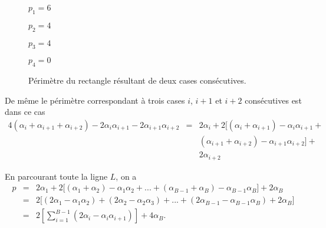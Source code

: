 \begin{Pre}
\begin{figure}[!htb]
\begin{minipage}[c]{.16\linewidth}
\begin{logicpuzzle}[rows=1,columns=2,color=cyan!100, width=750px,scale=0.5]
\framepuzzle[black!50]
\end{logicpuzzle}
$p_{1}=6$\quad\quad\quad
\end{minipage}
\hfill
\begin{minipage}[c]{.16\linewidth}
  \centering
\begin{logicpuzzle}[rows=1,columns=2,color=cyan!100, width=750px,scale=0.5]
\framepuzzle[black!50]
\end{logicpuzzle}
$p_{2}=4$\quad\quad\quad
\end{minipage}
\hfill
\begin{minipage}[c]{.16\linewidth}
  \centering
\begin{logicpuzzle}[rows=1,columns=2,color=cyan!100, width=750px,scale=0.5]
\framepuzzle[black!50]
\end{logicpuzzle}
$p_{3}=4$\quad\quad\quad
\end{minipage}
\hfill
\begin{minipage}[c]{.16\linewidth}
  \centering
\begin{logicpuzzle}[rows=1,columns=2,color=cyan!100, width=750px,scale=0.5]
\framepuzzle[black!50]
\end{logicpuzzle}
$p_{4}=0$\quad\quad\quad
\end{minipage}
\caption{\label{pericase2} Périmètre du rectangle résultant de  deux cases consécutives.}
\end{figure}
De même le périmètre correspondant à trois cases $i$, $i+1$ et $i+2$ consécutives est dans ce cas
\begin{eqnarray*}
4(\alpha_{i} + \alpha_{i+1}+\alpha_{i+2})-2\alpha_{i}\alpha_{i+1}-2\alpha_{i+1}\alpha_{i+2} &=& 2\alpha_{i} + 2\lbrack( \alpha_{i} + \alpha_{i+1})-\alpha_{i}\alpha_{i+1} +\\
& & (\alpha_{i+1} + \alpha_{i+2})-\alpha_{i+1}\alpha_{i+2} \rbrack +\\ 
& &2\alpha_{i+2}
\end{eqnarray*}

En parcourant  toute la ligne $L$, on a
\begin{eqnarray*}
p & = & 2\alpha_{1} + 2\lbrack (\alpha_{1} +\alpha_{2})-\alpha_{1}\alpha_{2}+...+ (\alpha_{B-1} +\alpha_{B})-\alpha_{B-1}\alpha_{B}\rbrack +2\alpha_{B} \\
& =& 2\lbrack(2\alpha_{1} -\alpha_{1}\alpha_{2})+ (2\alpha_{2} -\alpha_{2}\alpha_{3}) +...+(2\alpha_{B-1} -\alpha_{B-1}\alpha_{B}) +2\alpha_{B}\rbrack\\
& = & 2\left[\sum_{i=1}^{B-1}(2\alpha_{i}-\alpha_{i}\alpha_{i+1})\right] + 4\alpha_{B}.
\end{eqnarray*}
\end{Pre}
